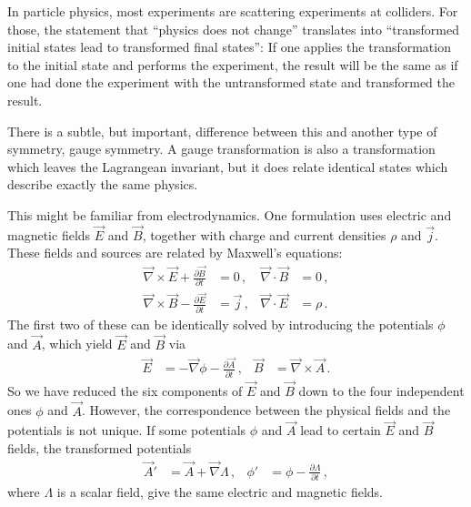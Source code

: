 \documentclass[12pt]{report}
\newcommand{\2}{\ensuremath{\sqrt{2}\,}}
\begin{document}
{      In particle physics, most experiments are scattering experiments at colliders. For those, the
      statement that ``physics does not change'' translates into ``transformed initial states lead
      to transformed final states'': If one applies the transformation to the initial state and
      performs the experiment, the result will be the same as if one had done the experiment with
      the untransformed state and transformed the result.
    
      \medskip
      
      There is a subtle, but important, difference between this and another type of symmetry,
      gauge symmetry.  A gauge transformation is also a transformation which leaves the Lagrangean
      invariant, but it does relate identical states which describe exactly the same
      physics.
      
      This might be familiar from electrodynamics. One formulation uses electric and magnetic
      fields $\vec{E}$ and $\vec{B}$, together with charge and current densities $\rho$ and
      $\vec{j}$. These fields and sources are related by Maxwell's equations:
      \begin{subequations}
        \begin{align}
          \vec{\nabla} \times \vec{E} + \frac{\partial \vec{B}}{\partial t} &=0 \,, & \vec{\nabla}\cdot
          \vec{B}&=0\,,\\ 
          \vec{\nabla} \times \vec{B} - \frac{\partial \vec{E}}{\partial t} &=\vec{j}\,,
          &\vec{\nabla}\cdot\vec{E} &=\rho\,.
        \end{align}
      \end{subequations}
      The first two of these can be identically solved by introducing the potentials $\phi$
      and $\vec{A}$, which yield $\vec{E}$ and $\vec{B}$ via
      \begin{align}\label{eq:gt}
        \vec{E}&= -\vec{\nabla} \phi -\frac{\partial\vec{A}}{\partial t}\,, & \vec{B}
        &=\vec{\nabla}\times\vec{A}\,.
      \end{align}
      So we have reduced the six components of $\vec{E}$ and $\vec{B}$ down to the four independent
      ones $\phi$ and $\vec{A}$. However, the correspondence between the physical fields and
      the potentials is not unique. If some potentials $\phi$ and $\vec{A}$ lead to
      certain $\vec{E}$ and $\vec{B}$ fields, the transformed potentials
      \begin{align}\label{eq:maxwellgaugetrafo}
        \vec{A}'&= \vec{A} +\vec{\nabla} \Lambda\,, & \phi'& = \phi- \frac{\partial\Lambda}{\partial t}\,,
      \end{align}
      where $\Lambda$ is a scalar field, give the same electric and magnetic fields.
      
}
\end{document}
